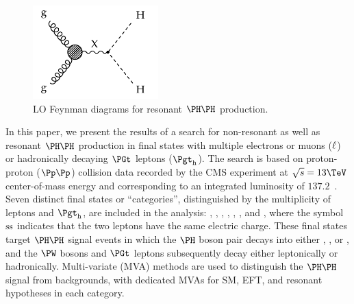 \begin{figure}[h!]
\setlength{\unitlength}{1mm}
\begin{center}
\includegraphics*[height=36mm]{figures/ggHH_resonant.pdf}
\end{center}
\caption{
  LO Feynman diagrams for resonant $\HH$ production.
}
\label{fig:Feynman_ggHH_resonant}
\end{figure}

In this paper, we present the results of a search for non-resonant as well as resonant $\HH$ production
in final states with multiple electrons or muons ($\Plepton$) or hadronically decaying $\PGt$ leptons ($\tauh$).
The search is based on proton-proton ($\Pp\Pp$) collision data recorded by the CMS experiment at $\sqrt{s} = 13\TeV$ center-of-mass energy
and corresponding to an integrated luminosity of $137.2$~\fbinv.
Seven distinct final states or ``categories'', distinguished by the multiplicity of leptons and $\tauh$, are included in the analysis:
\twoLeptonssZeroTau, \threeLeptonZeroTau, \fourLeptonZeroTau, \threeLeptonOneTau, \twoLeptonTwoTau, \oneLeptonThreeTau, and \zeroLeptonFourTau,
where the symbol $\ss$ indicates that the two leptons have the same electric charge. 
These final states target $\HH$ signal events in which the $\PHiggs$ boson pair decays into either \WWWW, \WWtt, or \tttt,
and the $\PW$ bosons and $\PGt$ leptons subsequently decay either leptonically or hadronically.
Multi-variate (MVA) methods are used to distinguish the $\HH$ signal from backgrounds,
with dedicated MVAs for SM, EFT, and resonant hypotheses in each category.

